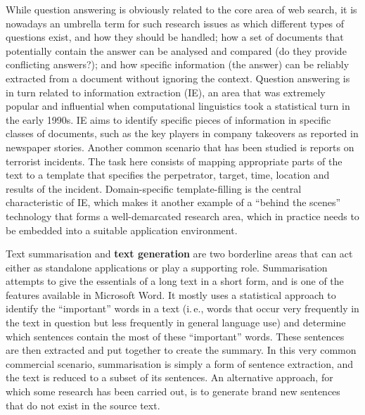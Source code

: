 \documentclass[]{../../metanetpaper}
\begin{document}
\begin{multicols}{2}
While question answering is obviously related to the core area of web search, it is nowadays an umbrella term for such research issues as which different types of questions exist, and how they should be handled; how a set of documents that potentially contain the answer can be analysed and compared (do they provide conflicting answers?); and how specific information (the answer) can be reliably extracted from a document without ignoring the context. Question answering is in turn related to information extraction (IE), an area that was extremely popular and influential when computational linguistics took a statistical turn in the early 1990s. IE aims to identify specific pieces of information in specific classes of documents, such as the key players in company takeovers as reported in newspaper stories. Another common scenario that has been studied is reports on terrorist incidents. The task here consists of mapping appropriate parts of the text to a template that specifies the perpetrator, target, time, location and results of the incident. Domain-specific template-filling is the central characteristic of IE, which makes it another example of a ``behind the scenes'' technology that forms a well-demarcated research area, which in practice needs to be embedded into a suitable application environment. 


Text summarisation and \textbf{text generation} are two borderline areas that can act either as standalone applications or play a supporting role. Summarisation attempts to give the essentials of a long text in a short form, and is one of the features available in Microsoft Word. It mostly uses a statistical approach to identify the ``important'' words in a text (i.\,e., words that occur very frequently in the text in question but less frequently in general language use) and determine which sentences contain the most of these ``important'' words. These sentences are then extracted and put together to create the summary. In this very common commercial scenario, summarisation is simply a form of sentence extraction, and the text is reduced to a subset of its sentences. An alternative approach, for which some research has been carried out, is to generate brand new sentences that do not exist in the source text. 



\end{multicols}
\end{document}
